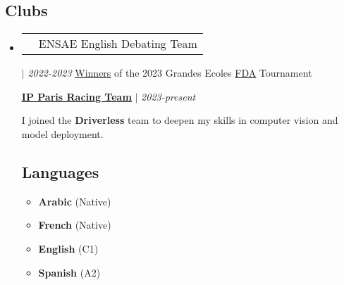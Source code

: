\documentclass[letterpaper,11pt]{article}
\makeatletter
\newcommand{\resumeItem}[1]{
  \item\small{
    {#1 \vspace{-2pt}}
  }
}
\newcommand{\resumeProjectHeading}[2]{
    \item
    \begin{tabular*}{0.97\textwidth}{l@{\extracolsep{\fill}}r}
      \small#1 & #2 \\
    \end{tabular*}\vspace{-7pt}
}
\newcommand{\resumeSubHeadingListStart}{\begin{itemize}[leftmargin=0.15in, label={}]}
\newcommand{\resumeSubHeadingListEnd}{\end{itemize}}
\newcommand{\resumeItemListStart}{\begin{itemize}}
\newcommand{\resumeItemListEnd}{\end{itemize}\vspace{-5pt}}
\makeatother
\begin{document}
\vspace{-10pt}
    \begin{multicols}{2}
    \section*{\faSlideshare\hspace{2pt}Clubs}
    \resumeSubHeadingListStart%
        
        \resumeProjectHeading%

        \textbf{ENSAE English Debating Team}  $|$ \footnotesize\emph{2022-2023}
        \newline
        \href{https://www.linkedin.com/feed/update/urn:li:activity:7050135401461669888?updateEntityUrn=urn%3Ali%3Afs_feedUpdate%3A%28V2%2Curn%3Ali%3Aactivity%3A7050135401461669888%29}{\underline{Winners}} {of the 2023 Grandes Ecoles \href{https://www.frenchdebatingassociation.fr/#fda}{\underline{FDA}} Tournament }
        \vspace{6pt}
        
        {\textbf{\href{https://www.linkedin.com/company/ip-paris-racing-team/?originalSubdomain=fr}{\underline{IP Paris Racing Team}}} $|$ \footnotesize\emph{2023-present}}
        
        {\small{I joined the \textbf{Driverless} team to deepen my skills in computer vision and model deployment.}}
        
    \columnbreak%
    

    
    \vspace{-10pt}
    \section*{\faLanguage\hspace{2pt}Languages}
    \resumeItemListStart{}
    \resumeItem{\textbf {Arabic} (Native)}
    \resumeItem{\textbf {French} (Native)}
    \resumeItem{\textbf {English} (C1)}
    \resumeItem{\textbf {Spanish} (A2)}
    \resumeItemListEnd{}
        
          
    \resumeSubHeadingListEnd%
    \end{multicols}
\end{document}
